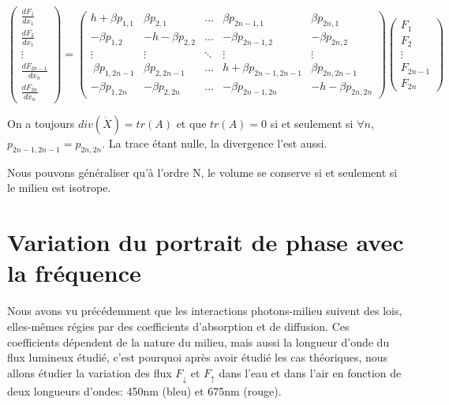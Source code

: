 \documentclass[12pt]{article}
\begin{document}
\begin{equation}
    \begin{pmatrix}
         \frac{dF_{1}}{dx_1}\\[4pt]
        \frac{dF_{2}}{dx_1}\\
        \vdots \\
        \frac{dF_{2n-1}}{dx_n}\\[4pt]
        \frac{dF_{2n}}{dx_n}
    \end{pmatrix}=
    \begin{pmatrix}
        h+\beta p_{{1},{1}} & \beta p_{{2},{1}} & \hdots & \beta p_{{2n-1},{1}} & \beta p_{{2n},{1}}\\
        -\beta p_{{1},{2}} & -h-\beta p_{{2},{2}} & \hdots & -\beta p_{{2n-1},{2}} & -\beta p_{{2n},{2}}\\
        \vdots & \vdots & \ddots & \vdots & \vdots \\\
        \beta p_{{1},{2n-1}} & \beta p_{{2},{2n-1}} & \hdots & h+\beta p_{{2n-1},{2n-1}} & \beta p_{{2n},{2n-1}}\\
        -\beta p_{{1},{2n}} & -\beta p_{{2},{2n}} & \hdots & -\beta p_{{2n-1},{2n}} & -h-\beta p_{{2n},{2n}}
    \end{pmatrix}
    \begin{pmatrix}
        F_{1}\\
        F_{2}\\
        \vdots \\
        F_{2n-1}\\
        F_{2n}
    \end{pmatrix}
    \label{eq:flux_matriciel_n_dim}
\end{equation}\par
On a toujours $div(\dot{X})=tr(A)$ et que $tr(A)=0$ si et seulement si $\forall n$, $p_{{2n-1},{2n-1}}=p_{{2n},{2n}}$. La trace étant nulle, la divergence l'est aussi.\par Nous pouvons généraliser qu'à l'ordre N, le volume se conserve si et seulement si le milieu est isotrope.

\section{Variation du portrait de phase avec la fréquence}
Nous avons vu précédemment que les interactions photons-milieu suivent des lois, elles-mêmes régies par des coefficients d'absorption et de diffusion.
Ces coefficients dépendent de la nature du milieu, mais aussi la longueur d'onde du flux lumineux étudié, c'est pourquoi après avoir étudié les cas théoriques, nous allons étudier la variation des flux $F_\downarrow$ et $F_\uparrow$ dans l'eau et dans l'air en fonction de deux longueurs d'ondes: 450nm (bleu) et 675nm (rouge).
\end{document}
